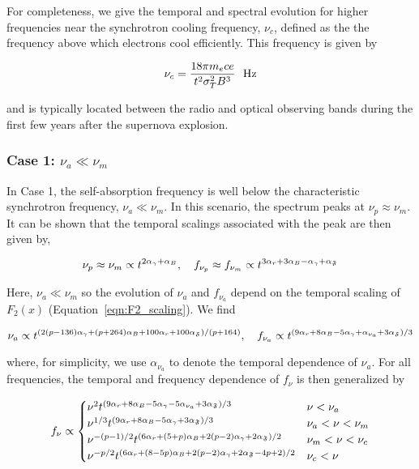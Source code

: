 \documentclass[12pt,preprint]{aastex}
\begin{document}
For completeness, we give the temporal and spectral evolution for
higher frequencies near the synchrotron cooling frequency, $\nu_c$,
defined as the the frequency above which electrons cool efficiently.
This frequency is given by

\begin{equation}
\nu_c = \frac{18\pi m_e c e}{t^2 \sigma_T^2 B^3}~~\rm Hz
\label{eqn:nu_c}
\end{equation}

\noindent
and is typically located between the radio and optical observing
bands during the first few years after the supernova explosion.  

\subsubsection{Case 1: $\nu_a \ll \nu_m$}
In Case 1, the self-absorption frequency is well below the
characteristic synchrotron frequency,  $\nu_a \ll \nu_m$.
In this scenario, the spectrum peaks at $\nu_{p}\approx \nu_m$.
It can be shown that the temporal scalings associated with the peak are
then given by,

\begin{equation}
\nu_{p} \approx \nu_m\propto t^{2\alpha_{\gamma}+\alpha_B},~~~
f_{\nu_{p}}\approx  f_{\nu_m}\propto t^{3\alpha_r+3\alpha_B-\alpha_{\gamma}+\alpha_{\frak{F}}}
\label{eqn:peak_1}
\end{equation}

\noindent
Here, $\nu_a \ll \nu_m$ so the evolution of $\nu_a$ and $f_{\nu_a}$
depend on the temporal scaling of $F_2(x)$
(Equation~\ref{eqn:F2_scaling}).  We find

\begin{equation}
\nu_a\propto t^{(2(p-136)\alpha_{\gamma}+(p+264)\alpha_B+100\alpha_r+100\alpha_{\frak{F}})/(p+164)},~~~
f_{\nu_a}\propto t^{(9\alpha_r+8\alpha_B-5\alpha_{\gamma}+\alpha_{\nu_a}+3\alpha_{\frak{F}})/3}
\label{eqn:nu_a_1}
\end{equation}

\noindent
where, for simplicity, we use $\alpha_{\nu_a}$ to denote the temporal
dependence of $\nu_a$.  For all frequencies, the temporal and frequency
dependence of $f_{\nu}$ is then generalized by

\begin{equation}
f_{\nu} \propto 
  \begin{cases}
    \nu^2 t^{(9\alpha_r+8\alpha_B-5\alpha_{\gamma}-5\alpha_{\nu_a}+3\alpha_{\frak{F}})/3} & \nu < \nu_a \\
    \nu^{1/3} t^{(9\alpha_r+8\alpha_B-5\alpha_{\gamma}+3\alpha_{\frak{F}})/3} & \nu_a < \nu < \nu_m \\
    \nu^{-(p-1)/2} t^{(6\alpha_r+(5+p)\alpha_B+2(p-2)\alpha_{\gamma} +2\alpha_{\frak{F}})/2} & \nu_m < \nu < \nu_c \\
    \nu^{-p/2} t^{(6\alpha_r+(8-5p)\alpha_B+2(p-2)\alpha_{\gamma}+2\alpha_{\frak{F}}-4p+2)/2} & \nu_c < \nu
  \end{cases}
\label{eqn:case_1}
\end{equation}
\end{document}
